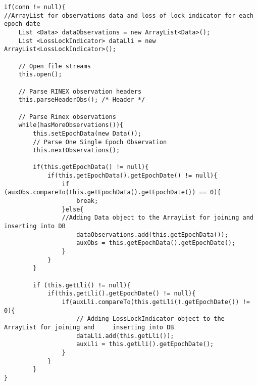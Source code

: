 \begin{lstlisting}
if(conn != null){
//ArrayList for observations data and loss of lock indicator for each epoch date
	List <Data> dataObservations = new ArrayList<Data>();
	List <LossLockIndicator> dataLli = new ArrayList<LossLockIndicator>();

	// Open file streams
	this.open();

	// Parse RINEX observation headers
	this.parseHeaderObs(); /* Header */

	// Parse Rinex observations
	while(hasMoreObservations()){
		this.setEpochData(new Data());
		// Parse One Single Epoch Observation
		this.nextObservations();

		if(this.getEpochData() != null){
			if(this.getEpochData().getEpochDate() != null){
				if (auxObs.compareTo(this.getEpochData().getEpochDate()) == 0){
					break;
				}else{
				//Adding Data object to the ArrayList for joining and inserting into DB
					dataObservations.add(this.getEpochData());
					auxObs = this.getEpochData().getEpochDate();
				}
			}
		}

		if (this.getLli() != null){
			if(this.getLli().getEpochDate() != null){
				if(auxLli.compareTo(this.getLli().getEpochDate()) != 0){
					// Adding LossLockIndicator object to the ArrayList for joining and 	inserting into DB
					dataLli.add(this.getLli());
					auxLli = this.getLli().getEpochDate();
				}
			}
		}
}
\end{lstlisting}